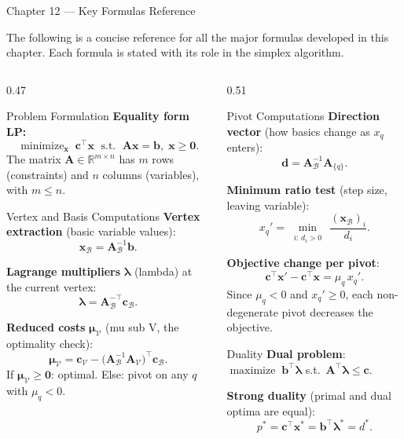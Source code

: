 \documentclass[aspectratio=169,10pt]{beamer}
\DeclareMathOperator*{\minimize}{minimize}
\DeclareMathOperator*{\maximize}{maximize}
\newcommand{\xv}{\mathbf{x}}
\newcommand{\cv}{\mathbf{c}}
\newcommand{\bv}{\mathbf{b}}
\newcommand{\Av}{\mathbf{A}}
\newcommand{\muv}{\boldsymbol{\mu}}
\newcommand{\lav}{\boldsymbol{\lambda}}
\newcommand{\calB}{\mathcal{B}}
\newcommand{\calV}{\mathcal{V}}
\begin{document}
\begin{frame}[allowframebreaks]{Chapter 12 --- Key Formulas Reference}

The following is a concise reference for all the major formulas developed in this
chapter.  Each formula is stated with its role in the simplex algorithm.

\begin{columns}[t]
  \begin{column}{0.47\textwidth}
    \begin{block}{Problem Formulation}
      \textbf{Equality form LP:}
      \[ \minimize_\xv\;\cv^\top\xv\;\text{ s.t.\ }\;\Av\xv=\bv,\;\xv\ge\mathbf{0}. \]
      The matrix $\Av \in \mathbb{R}^{m\times n}$ has $m$ rows (constraints) and
      $n$ columns (variables), with $m \le n$.
    \end{block}

    \begin{block}{Vertex and Basis Computations}
      \textbf{Vertex extraction} (basic variable values):
      \[ \xv_\calB = \Av_\calB^{-1}\bv. \]

      \textbf{Lagrange multipliers} $\lav$ (lambda) at the current vertex:
      \[ \lav = \Av_\calB^{-\top}\cv_\calB. \]

      \textbf{Reduced costs} $\muv_\calV$ (mu sub V, the optimality check):
      \[ \muv_\calV = \cv_\calV - \bigl(\Av_\calB^{-1}\Av_\calV\bigr)^\top\cv_\calB. \]
      If $\muv_\calV \ge \mathbf{0}$: optimal.  Else: pivot on any $q$ with $\mu_q < 0$.
    \end{block}
  \end{column}
  \begin{column}{0.51\textwidth}
    \begin{block}{Pivot Computations}
      \textbf{Direction vector} (how basics change as $x_q$ enters):
      \[ \mathbf{d} = \Av_\calB^{-1}\Av_{\{q\}}. \]

      \textbf{Minimum ratio test} (step size, leaving variable):
      \[ x_q' = \min_{\substack{i:\,d_i>0}}\,\frac{(\xv_\calB)_i}{d_i}. \]

      \textbf{Objective change per pivot}:
      \[ \cv^\top\xv' - \cv^\top\xv = \mu_q\,x_q'. \]
      Since $\mu_q < 0$ and $x_q' \ge 0$, each non-degenerate pivot decreases the
      objective.
    \end{block}

    \begin{block}{Duality}
      \textbf{Dual problem}: $\maximize\;\bv^\top\lav$ s.t.\ $\Av^\top\lav \le \cv$.

      \textbf{Strong duality} (primal and dual optima are equal):
      \[ p^* = \cv^\top\xv^* = \bv^\top\lav^* = d^*. \]
    \end{block}
  \end{column}
\end{columns}

\end{frame}
\end{document}
